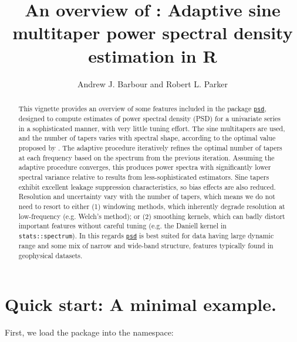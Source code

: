 \documentclass[10pt]{article}\usepackage[]{graphicx}\usepackage[]{color}
\author{Andrew J. Barbour and Robert L. Parker}
\title{An overview of \psd{}: Adaptive sine multitaper power spectral density estimation in R}
\newcommand{\Rcmd}[1]{\texttt{#1}}
\newcommand{\psd}[0]{\href{http://abarbour.github.com/psd/}{\color{blue}\Rcmd{psd}}}
\begin{document}
\maketitle
\begin{abstract}
  This vignette provides an overview of some 
  features included in the package \psd{}, designed to
  compute estimates of power spectral
  density (PSD) for a univariate series in a sophisticated manner,
  with very little tuning effort.
  The sine multitapers are used, and
  the number of tapers varies with spectral shape, according
  to the optimal value proposed by \citet{rs1995}.
  The adaptive procedure
  iteratively refines the optimal number of tapers at each frequency
  based on the spectrum from the previous iteration.
  Assuming the adaptive procedure converges, 
  this produces power spectra
  with significantly
  lower spectral variance 
  relative to results from less-sophisticated estimators.
  Sine tapers exhibit excellent
  leakage suppression characteristics, so bias effects
  are also reduced.
  Resolution and uncertainty vary with the number of tapers,
  which means we do
  not need to resort to either (1) windowing methods,
  which inherently degrade resolution at low-frequency
  (e.g. Welch's method); or (2) smoothing kernels,
  which can badly distort important features without careful tuning
  (e.g. the Daniell kernel in \Rcmd{stats::spectrum}).
  In this regards
  \psd{} is best suited for data having 
   large dynamic range and some mix of narrow and wide-band structure,
   features typically found in geophysical datasets.
\end{abstract}

\tableofcontents
\pagebreak

\section{Quick start: A minimal example.}
First, we load the package into the namespace:
\end{document}
